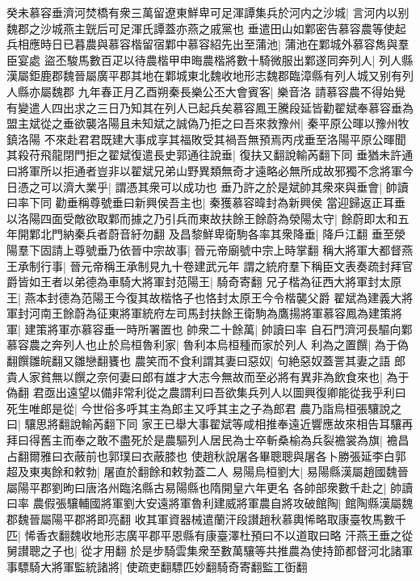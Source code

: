 癸未慕容垂濟河焚橋有衆三萬留遼東鮮卑可足渾譚集兵於河内之沙城|{
	言河内以别魏郡之沙城燕主皝后可足渾氏譚蓋亦燕之戚黨也}
垂遣田山如鄴密告慕容農等使起兵相應時日已暮農與慕容楷留宿鄴中慕容紹先出至蒲池|{
	蒲池在鄴城外慕容雋與羣臣宴處}
盜丕駿馬數百疋以待農楷甲申晦農楷將數十騎微服出鄴遂同奔列人|{
	列人縣漢屬鉅鹿郡魏晉屬廣平郡其地在鄴城東北魏收地形志魏郡臨漳縣有列人城又别有列人縣亦屬魏郡}
九年春正月乙酉朔秦長樂公丕大會賓客|{
	樂音洛}
請慕容農不得始覺有變遣人四出求之三日乃知其在列人已起兵矣慕容鳳王騰段延皆勸翟斌奉慕容垂為盟主斌從之垂欲襲洛陽且未知斌之誠偽乃拒之曰吾來救豫州|{
	秦平原公暉以豫州牧鎮洛陽}
不來赴君君既建大事成享其福敗受其禍吾無預焉丙戌垂至洛陽平原公暉聞其殺苻飛龍閉門拒之翟斌復遣長史郭通往說垂|{
	復扶又翻說輸芮翻下同}
垂猶未許通曰將軍所以拒通者豈非以翟斌兄弟山野異類無奇才遠略必無所成故邪獨不念將軍今日憑之可以濟大業乎|{
	謂憑其衆可以成功也}
垂乃許之於是斌帥其衆來與垂會|{
	帥讀曰率下同}
勸垂稱尊號垂曰新興侯吾主也|{
	秦獲慕容暐封為新興侯}
當迎歸返正耳垂以洛陽四面受敵欲取鄴而據之乃引兵而東故扶餘王餘蔚為滎陽太守|{
	餘蔚即太和五年開鄴北門納秦兵者蔚音紆勿翻}
及昌黎鮮卑衛駒各率其衆降垂|{
	降戶江翻}
垂至滎陽羣下固請上尊號垂乃依晉中宗故事|{
	晉元帝廟號中宗上時掌翻}
稱大將軍大都督燕王承制行事|{
	晉元帝稱王承制見九十卷建武元年}
謂之統府羣下稱臣文表奏疏封拜官爵皆如王者以弟德為車騎大將軍封范陽王|{
	騎奇寄翻}
兄子楷為征西大將軍封太原王|{
	燕本封德為范陽王今復其故楷恪子也恪封太原王今令楷襲父爵}
翟斌為建義大將軍封河南王餘蔚為征東將軍統府左司馬封扶餘王衛駒為鷹揚將軍慕容鳳為建策將軍|{
	建策將軍亦慕容垂一時所署置也}
帥衆二十餘萬|{
	帥讀曰率}
自石門濟河長驅向鄴慕容農之奔列人也止於烏桓魯利家|{
	魯利本烏桓種而家於列人}
利為之置饌|{
	為于偽翻饌雛皖翻又雛戀翻饔也}
農笑而不食利謂其妻曰惡奴|{
	句絶惡奴蓋詈其妻之語}
郎貴人家貧無以饌之奈何妻曰郎有雄才大志今無故而至必將有異非為飲食來也|{
	為于偽翻}
君亟出遠望以備非常利從之農謂利曰吾欲集兵列人以圖興復卿能從我乎利曰死生唯郎是從|{
	今世俗多呼其主為郎主又呼其主之子為郎君}
農乃詣烏桓張驤說之曰|{
	驤思將翻說輸芮翻下同}
家王已舉大事翟斌等咸相推奉遠近響應故來相告耳驤再拜曰得舊主而奉之敢不盡死於是農驅列人居民為士卒斬桑榆為兵裂襜裳為旗|{
	襜昌占翻爾雅曰衣蔽前也郭璞曰衣蔽膝也}
使趙秋說屠各畢聰聰與屠各卜勝張延李白郭超及東夷餘和敕勃|{
	屠直於翻餘和敕勃蓋二人}
易陽烏桓劉大|{
	易陽縣漢屬趙國魏晉屬陽平郡劉昫曰唐洛州臨洺縣古易陽縣也隋開皇六年更名}
各帥部衆數千赴之|{
	帥讀曰率}
農假張驤輔國將軍劉大安遠將軍魯利建威將軍農自將攻破館陶|{
	館陶縣漢屬魏郡魏晉屬陽平郡將即亮翻}
收其軍資器械遣蘭汗段讃趙秋慕輿悕略取康臺牧馬數千匹|{
	悕香衣翻魏收地形志廣平郡平恩縣有康臺澤杜預曰不以道取曰略}
汗燕王垂之從舅讃聰之子也|{
	從才用翻}
於是步騎雲集衆至數萬驤等共推農為使持節都督河北諸軍事驃騎大將軍監統諸將|{
	使疏吏翻驃匹妙翻騎奇寄翻監工衘翻}
